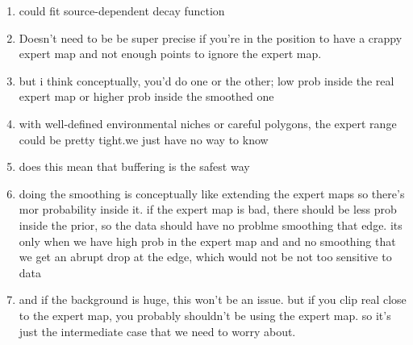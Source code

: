 \begin{enumerate}
  \item could fit source-dependent decay function
  \item Doesn't need to be be super precise if you're in the position to have a crappy expert map and not enough points to ignore the expert map.
  \item but i think conceptually, you'd do one or the other; low prob inside the real expert map or higher prob inside the smoothed one
  \item with well-defined environmental niches or careful polygons, the expert range could be pretty tight.we just have no way to know
  \item does this mean that buffering is the safest way
  \item doing the smoothing is conceptually like extending the expert maps so there's mor probability inside it. if the expert map is bad, there should be less prob inside the prior, so the data should have no problme smoothing that edge.
its only when we have high prob in the expert map and and no smoothing that we get an abrupt drop at the edge, which would not be  not too sensitive to data
  \item and if the background is huge, this won't be an issue. but if you clip real close to the expert map, you probably shouldn't be using the expert map. so it's just the intermediate case that we need to worry about.
\end{enumerate}
